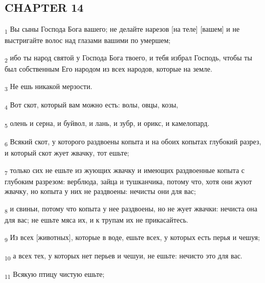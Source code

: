 \subsection{CHAPTER 14}
\begin{tcolorbox}
\textsubscript{1} Вы сыны Господа Бога вашего; не делайте нарезов [на теле] [вашем] и не выстригайте волос над глазами вашими по умершем;
\end{tcolorbox}
\begin{tcolorbox}
\textsubscript{2} ибо ты народ святой у Господа Бога твоего, и тебя избрал Господь, чтобы ты был собственным Его народом из всех народов, которые на земле.
\end{tcolorbox}
\begin{tcolorbox}
\textsubscript{3} Не ешь никакой мерзости.
\end{tcolorbox}
\begin{tcolorbox}
\textsubscript{4} Вот скот, который вам можно есть: волы, овцы, козы,
\end{tcolorbox}
\begin{tcolorbox}
\textsubscript{5} олень и серна, и буйвол, и лань, и зубр, и орикс, и камелопард.
\end{tcolorbox}
\begin{tcolorbox}
\textsubscript{6} Всякий скот, у которого раздвоены копыта и на обоих копытах глубокий разрез, и который скот жует жвачку, тот ешьте;
\end{tcolorbox}
\begin{tcolorbox}
\textsubscript{7} только сих не ешьте из жующих жвачку и имеющих раздвоенные копыта с глубоким разрезом: верблюда, зайца и тушканчика, потому что, хотя они жуют жвачку, но копыта у них не раздвоены: нечисты они для вас;
\end{tcolorbox}
\begin{tcolorbox}
\textsubscript{8} и свиньи, потому что копыта у нее раздвоены, но не жует жвачки: нечиста она для вас; не ешьте мяса их, и к трупам их не прикасайтесь.
\end{tcolorbox}
\begin{tcolorbox}
\textsubscript{9} Из всех [животных], которые в воде, ешьте всех, у которых есть перья и чешуя;
\end{tcolorbox}
\begin{tcolorbox}
\textsubscript{10} а всех тех, у которых нет перьев и чешуи, не ешьте: нечисто это для вас.
\end{tcolorbox}
\begin{tcolorbox}
\textsubscript{11} Всякую птицу чистую ешьте;
\end{tcolorbox}
